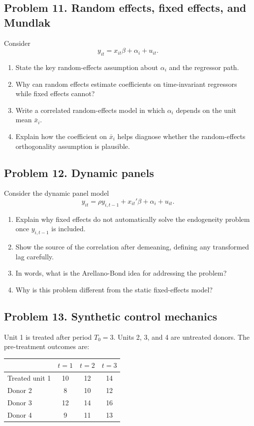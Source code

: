 \documentclass[11pt]{article}
\begin{document}
\subsection*{Problem 11. Random effects, fixed effects, and Mundlak}

Consider
\[
y_{it}=x_{it}\beta+\alpha_i+u_{it}.
\]

\begin{enumerate}[label=(\alph*)]
\item State the key random-effects assumption about $\alpha_i$ and the regressor path.
\item Why can random effects estimate coefficients on time-invariant regressors while fixed effects cannot?
\item Write a correlated random-effects model in which $\alpha_i$ depends on the unit mean $\bar{x}_i$.
\item Explain how the coefficient on $\bar{x}_i$ helps diagnose whether the random-effects orthogonality assumption is plausible.
\end{enumerate}

\subsection*{Problem 12. Dynamic panels}

Consider the dynamic panel model
\[
y_{it}=\rho y_{i,t-1}+x_{it}'\beta+\alpha_i+u_{it}.
\]

\begin{enumerate}[label=(\alph*)]
\item Explain why fixed effects do not automatically solve the endogeneity problem once $y_{i,t-1}$ is included.
\item Show the source of the correlation after demeaning, defining any transformed lag carefully.
\item In words, what is the Arellano-Bond idea for addressing the problem?
\item Why is this problem different from the static fixed-effects model?
\end{enumerate}

\subsection*{Problem 13. Synthetic control mechanics}

Unit 1 is treated after period $T_0=3$. Units 2, 3, and 4 are untreated donors. The pre-treatment outcomes are:

\begin{center}
\begin{tabular}{lccc}
\toprule
 & $t=1$ & $t=2$ & $t=3$ \\
\midrule
Treated unit 1 & 10 & 12 & 14 \\
Donor 2 & 8 & 10 & 12 \\
Donor 3 & 12 & 14 & 16 \\
Donor 4 & 9 & 11 & 13 \\
\bottomrule
\end{tabular}
\end{center}
\end{document}
